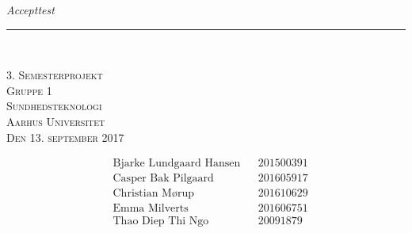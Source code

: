\thispagestyle{empty}
\begin{flushright}
\vspace{3cm}

\phantom{hul}

\phantom{hul}

\phantom{hul}

\textsl{\Huge Accepttest} \\ \vspace{1cm}

\rule{13cm}{3mm} \\ \vspace{1.5cm}
\vspace{1cm}

\vspace{2cm} 
\textsc{\Large 3. Semesterprojekt \\
Gruppe 1 \\
Sundhedsteknologi \\
Aarhus Universitet \\
Den 13. september 2017 \\
}
\end{flushright}

\vspace*{\fill}

\begin{align*}
&\text{Bjarke Lundgaard Hansen} &&\text{201500391}\\
&\text{Casper Bak Pilgaard} &&\text{201605917}\\
&\text{Christian Mørup} &&\text{201610629}\\
&\text{Emma Milverts} &&\text{201606751}\\
&\text{Thao Diep Thi Ngo} &&\text{20091879}\\
\end{align*}
